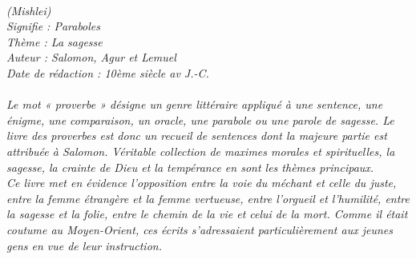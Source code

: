 \BFont
\noindent\hrulefill
{\footnotesize
\textit{
\bigskip
{\centering{}
\\(Mishlei)
\\Signifie : Paraboles
\\Thème : La sagesse
\\Auteur : Salomon, Agur et Lemuel
\\Date de rédaction : 10ème siècle av J.-C.\\}
}
\textit{
\\Le  mot  « proverbe » désigne un genre littéraire appliqué à une sentence, une énigme, une comparaison, un oracle, une parabole ou une parole de sagesse. Le livre des proverbes est donc un recueil de sentences dont la majeure partie est attribuée à Salomon. Véritable collection de maximes morales et spirituelles, la sagesse, la crainte de Dieu et la tempérance en sont les thèmes principaux. 
\\Ce livre met en évidence l’opposition entre la voie du méchant et celle du juste, entre la femme étrangère et la femme vertueuse,  entre l’orgueil et l’humilité, entre la sagesse et la folie, entre le chemin de la vie et celui de la mort.  Comme il était coutume au Moyen-Orient, ces écrits s’adressaient particulièrement aux jeunes gens en vue de leur instruction.\bigskip
}
}
\par\nobreak\noindent\hrulefill
